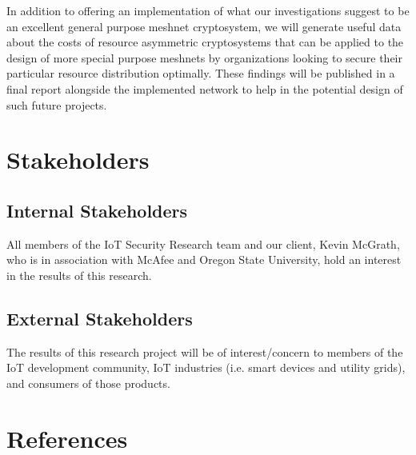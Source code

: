 \documentclass[tikz,a4paper,titlepage]{article}
\begin{document}
In addition to offering an implementation of what our investigations suggest to be an excellent general purpose meshnet cryptosystem, we will generate useful data about the costs of resource asymmetric cryptosystems that can be applied to the design of more special purpose meshnets by organizations looking to secure their particular resource distribution optimally. These findings will be published in a final report alongside the implemented network to help in the potential design of such future projects.

\section{Stakeholders}

\subsection{Internal Stakeholders}

All members of the IoT Security Research team and our client, Kevin McGrath, who is in association with McAfee and Oregon State University, hold an interest in the results of this research.


\subsection{External Stakeholders}

The results of this research project will be of interest/concern to members of the IoT development community, IoT industries (i.e. smart devices and utility grids), and consumers of those products. 



\section{References}

\begingroup
\renewcommand{\section}[2]{}%


\endgroup 
\end{document}

